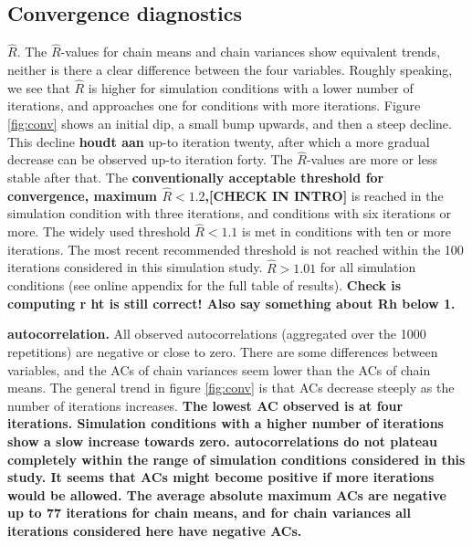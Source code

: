 \documentclass[article]{jss}
\begin{document}
\subsection{Convergence diagnostics}

\textbf{$\widehat{R}$}. The $\widehat{R}$-values for chain means and chain variances show equivalent trends, neither is there a clear difference between the four variables. Roughly speaking, we see that $\widehat{R}$ is higher for simulation conditions with a lower number of iterations, and approaches one for conditions with more iterations. Figure \ref{fig:conv} shows an initial dip, a small bump upwards, and then a steep decline. This decline \textbf{houdt aan} up-to iteration twenty, after which a more gradual decrease can be observed up-to iteration forty. The $\widehat{R}$-values are more or less stable after that. The \textbf{conventionally acceptable threshold for convergence, maximum $\widehat{R} < 1.2$,[CHECK IN INTRO]} is reached in the simulation condition with three iterations, and conditions with six iterations or more. The widely used threshold $\widehat{R} < 1.1$ is met in conditions with ten or more iterations. The most recent recommended threshold is not reached within the 100 iterations considered in this simulation study. $\widehat{R} > 1.01$ for all simulation conditions (see online appendix for the full table of results). \textbf{Check is computing r ht is still correct! Also say something about Rh below 1.}

\textbf{autocorrelation.} All observed autocorrelations (aggregated over the 1000 repetitions) are negative or close to zero. There are some differences between variables, and the ACs of chain variances seem lower than the ACs of chain means. The general trend in figure \ref{fig:conv} is that ACs decrease steeply as the number of iterations increases.  \textbf{The lowest AC observed is %
at four iterations. Simulation conditions with a higher number of iterations show a slow increase towards zero. autocorrelations do not plateau completely within the range of simulation conditions considered in this study. It seems that ACs might become positive if more iterations would be allowed. The average absolute maximum ACs are negative up to 77 iterations for chain means, and for chain variances all iterations considered here have negative ACs.}

\end{document}

